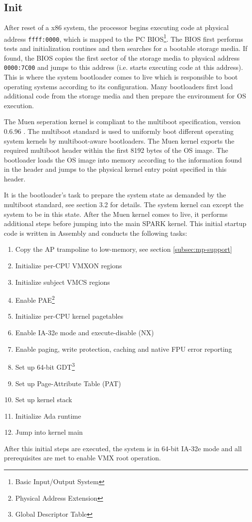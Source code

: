 \subsection{Init}\label{subsec:init}
After reset of a x86 system, the processor begins executing code at physical
address \texttt{ffff:0000}, which is mapped to the PC
BIOS\footnote{Basic Input/Output System}. The BIOS first performs
tests and initialization routines and then searches for a bootable storage
media. If found, the BIOS copies the first sector of the storage media to
physical address \texttt{0000:7C00} and jumps to this address (i.e. starts
executing code at this address). This is where the system bootloader comes to
live which is responsible to boot operating systems according to its
configuration. Many bootloaders first load additional code from the storage
media and then prepare the environment for OS execution.

The Muen seperation kernel is compliant to the multiboot specification, version
0.6.96 \cite{multiboot}. The multiboot standard is used to uniformly boot
different operating system kernels by multiboot-aware bootloaders.
The Muen kernel exports the required multiboot header within the first 8192
bytes of the OS image. The bootloader loads the OS image into memory according
to the information found in the header and jumps to the physical kernel entry
point specified in this header.

It is the bootloader's task to prepare the system state as demanded by the
multiboot standard, see \cite{multiboot} section 3.2 for details. The system
kernel can except the system to be in this state. After the Muen kernel comes to
live, it performs additional steps before jumping into the main SPARK kernel.
This initial startup code is written in Assembly and conducts the following
tasks:
\begin{enumerate}
	\item Copy the AP trampoline to low-memory, see section
		\ref{subsec:mp-support} \item Initialize per-CPU VMXON regions
	\item Initialize subject VMCS regions
	\item Enable PAE\footnote{Physical Address Extension}
	\item Initialize per-CPU kernel pagetables
	\item Enable IA-32e mode and execute-disable (NX)
	\item Enable paging, write protection, caching and native FPU error
		reporting
	\item Set up 64-bit GDT\footnote{Global Descriptor Table}
	\item Set up Page-Attribute Table (PAT)
	\item Set up kernel stack
	\item Initialize Ada runtime
	\item Jump into kernel main
\end{enumerate}
After this initial steps are executed, the system is in 64-bit IA-32e mode and
all prerequisites are met to enable VMX root operation.

